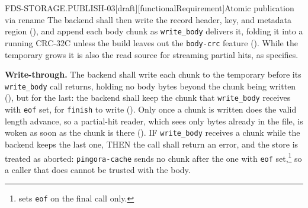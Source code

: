 \begin{requirement}{FDS-STORAGE.PUBLISH-03}[draft][functionalRequirement]{Atomic publication via rename}
  The backend shall then write the record header, key, and metadata region
  (), and append each body chunk as
  \texttt{write\_body} delivers it, folding it into a running CRC-32C unless
  the build leaves out the \texttt{body-crc} feature
  (). While the temporary grows it is
  also the read source for streaming partial hits, as
   specifies.

  \textbf{Write-through.} The backend shall write each chunk to the
  temporary before its \texttt{write\_body} call returns, holding no body
  bytes beyond the chunk being written (), but
  for the last: the backend shall keep the chunk that \texttt{write\_body}
  receives with \texttt{eof} set, for \texttt{finish} to write
  (). Only once a chunk is written does the
  valid length advance, so
  a partial-hit reader, which sees only bytes already in the file, is woken
  as soon as the chunk is there (). IF
  \texttt{write\_body} receives a chunk while the backend keeps the last
  one, THEN the call shall return an error, and the store is treated as
  aborted: \texttt{pingora-cache} sends no chunk after the one with
  \texttt{eof} set,\footnote{
  sets \texttt{eof} on the final call only.} so a caller that does cannot
  be trusted with the body.


\end{requirement}
